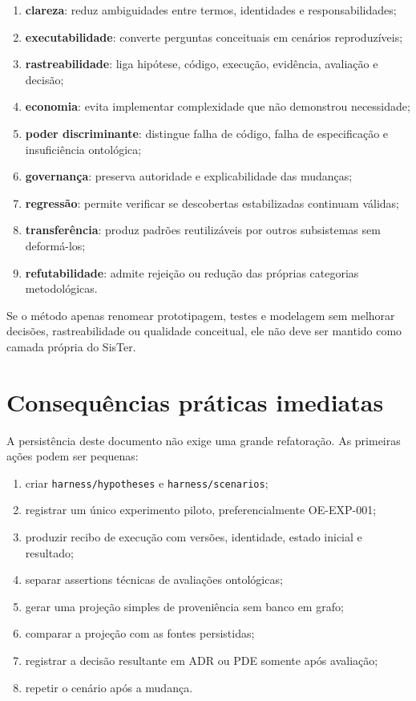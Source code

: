 \documentclass[11pt,a4paper,oneside]{article}
\begin{document}
\begin{enumerate}
  \item \textbf{clareza}: reduz ambiguidades entre termos, identidades e responsabilidades;
  \item \textbf{executabilidade}: converte perguntas conceituais em cenários reproduzíveis;
  \item \textbf{rastreabilidade}: liga hipótese, código, execução, evidência, avaliação e decisão;
  \item \textbf{economia}: evita implementar complexidade que não demonstrou necessidade;
  \item \textbf{poder discriminante}: distingue falha de código, falha de especificação e insuficiência ontológica;
  \item \textbf{governança}: preserva autoridade e explicabilidade das mudanças;
  \item \textbf{regressão}: permite verificar se descobertas estabilizadas continuam válidas;
  \item \textbf{transferência}: produz padrões reutilizáveis por outros subsistemas sem deformá-los;
  \item \textbf{refutabilidade}: admite rejeição ou redução das próprias categorias metodológicas.
\end{enumerate}

\begin{alerta}
Se o método apenas renomear prototipagem, testes e modelagem sem melhorar decisões, rastreabilidade ou qualidade conceitual, ele não deve ser mantido como camada própria do SisTer.
\end{alerta}

\section{Consequências práticas imediatas}

A persistência deste documento não exige uma grande refatoração. As primeiras ações podem ser pequenas:

\begin{enumerate}
  \item criar \texttt{harness/hypotheses} e \texttt{harness/scenarios};
  \item registrar um único experimento piloto, preferencialmente OE-EXP-001;
  \item produzir recibo de execução com versões, identidade, estado inicial e resultado;
  \item separar assertions técnicas de avaliações ontológicas;
  \item gerar uma projeção simples de proveniência sem banco em grafo;
  \item comparar a projeção com as fontes persistidas;
  \item registrar a decisão resultante em ADR ou PDE somente após avaliação;
  \item repetir o cenário após a mudança.
\end{enumerate}
\end{document}

